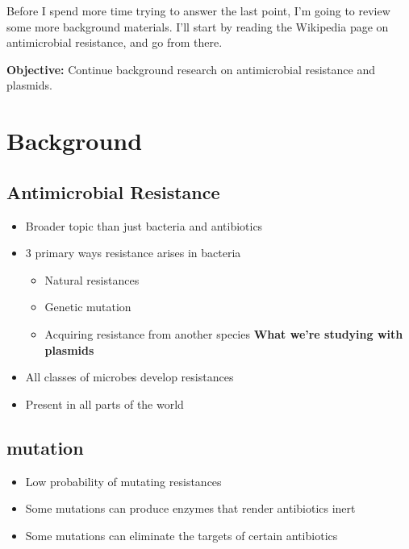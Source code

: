 \documentclass[oneside]{labbook}
\newcommand{\obj}[1]{\textbf{Objective:} #1}
\begin{document}
Before I spend more time trying to answer the last point, I'm going to review some
more background materials. I'll start by reading the Wikipedia page on antimicrobial
resistance, and go from there.


\obj{Continue background research on antimicrobial resistance and plasmids.}

\section{Background}
\subsection*{Antimicrobial Resistance}

\begin {itemize}[label={--}]
\item Broader topic than just bacteria and antibiotics
\item 3 primary ways resistance arises in bacteria
\begin{itemize}
  \item Natural resistances
  \item Genetic mutation
  \item Acquiring resistance from another species \textbf{What we're studying with plasmids}
\end{itemize}
\item All classes of microbes develop resistances
\item Present in all parts of the world
\end{itemize}


\subsection*{mutation}
\begin{itemize}
  \item Low probability of mutating resistances
  \item Some mutations can produce enzymes that render antibiotics inert
  \item Some mutations can eliminate the targets of certain antibiotics
\end{itemize}
\end{document}
